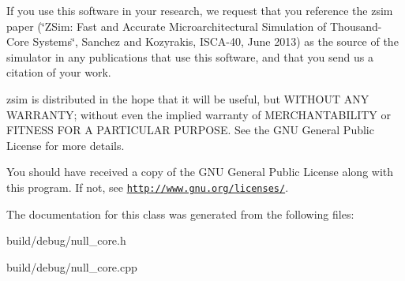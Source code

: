 If you use this software in your research, we request that you reference the zsim paper (\char`\"{}\-Z\-Sim\-: Fast and Accurate Microarchitectural Simulation of
\-Thousand-\/\-Core Systems\char`\"{}, Sanchez and Kozyrakis, I\-S\-C\-A-\/40, June 2013) as the source of the simulator in any publications that use this software, and that you send us a citation of your work.

zsim is distributed in the hope that it will be useful, but W\-I\-T\-H\-O\-U\-T A\-N\-Y W\-A\-R\-R\-A\-N\-T\-Y; without even the implied warranty of M\-E\-R\-C\-H\-A\-N\-T\-A\-B\-I\-L\-I\-T\-Y or F\-I\-T\-N\-E\-S\-S F\-O\-R A P\-A\-R\-T\-I\-C\-U\-L\-A\-R P\-U\-R\-P\-O\-S\-E. See the G\-N\-U General Public License for more details.

You should have received a copy of the G\-N\-U General Public License along with this program. If not, see \href{http://www.gnu.org/licenses/}{\tt http\-://www.\-gnu.\-org/licenses/}. 

The documentation for this class was generated from the following files\-:\begin{DoxyCompactItemize}
\item 
build/debug/null\-\_\-core.\-h\item 
build/debug/null\-\_\-core.\-cpp\end{DoxyCompactItemize}
